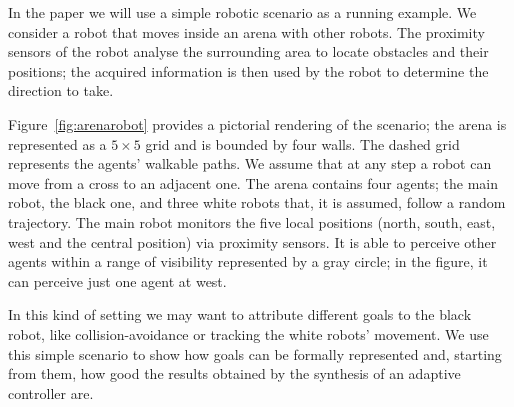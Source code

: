 In the paper we will use a simple robotic scenario as a running example. We consider a robot that moves inside an arena with other robots. %
The proximity sensors of the robot analyse the surrounding area to locate obstacles and their positions; the acquired information is then used by the robot to determine the direction to take.

Figure~\ref{fig:arenarobot} provides a pictorial rendering of the scenario; the arena is represented as a $5\times 5$ grid and is bounded by four walls. The dashed grid represents the agents' walkable paths. %
We assume that at any step a robot can move from a cross to an adjacent one.
The arena contains four agents; the main robot, the black one, and three white robots that, it is assumed, follow a random trajectory. The main robot monitors the five local positions (north, south, east, west and the central position) via proximity sensors. It is able to perceive other agents within a range of visibility represented by a gray circle; in the figure, it can perceive just one agent at west.

In this kind of setting we may want to attribute different goals to the black robot, like collision-avoidance or tracking the white robots' movement. We use this simple scenario to show how goals can be formally represented and, starting from them, how good the results obtained by the synthesis of an adaptive controller are.



